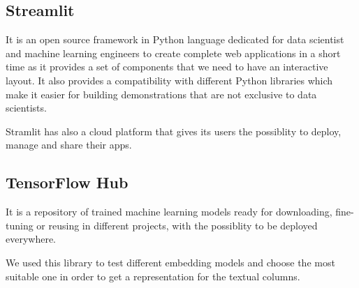 \subsection{Streamlit}
It is an open source framework in Python language dedicated for data scientist
and machine learning engineers to create complete web applications in a short
time as it provides a set of components that we need to have an interactive
layout. It also provides a compatibility with different Python libraries which
make it easier for building demonstrations that are not exclusive to data
scientists.

Stramlit has also a cloud platform that gives its users the possiblity to
deploy, manage and share their apps.

\subsection{TensorFlow Hub}
It is a repository of trained machine learning models ready for downloading,
fine-tuning or reusing in different projects, with the possiblity to be deployed
everywhere.

We used this library to test different embedding models and choose the most
suitable one in order to get a representation for the textual columns.